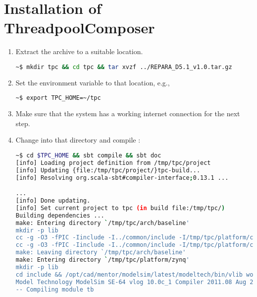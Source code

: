 \section{Installation of ThreadpoolComposer}%
\begin{enumerate}
  \item Extract the \tpc{} archive to a suitable location.
%
\begin{lstlisting}[language=bash]
~$ mkdir tpc && cd tpc && tar xvzf ../REPARA_D5.1_v1.0.tar.gz
\end{lstlisting}
%
  \item Set the  environment variable to that location, e.g.,
%
\begin{lstlisting}[language=bash]
~$ export TPC_HOME=~/tpc
\end{lstlisting}
%
  \item Make sure that the system has a working internet connection for the next step.
  \item Change into that directory and compile \tpc{}:
        \begin{lstlisting}[language=bash]
~$ cd $TPC_HOME && sbt compile && sbt doc
[info] Loading project definition from /tmp/tpc/project
[info] Updating {file:/tmp/tpc/project/}tpc-build...
[info] Resolving org.scala-sbt#compiler-interface;0.13.1 ...

...
[info] Done updating.
[info] Set current project to tpc (in build file:/tmp/tpc/)
Building dependencies ...
make: Entering directory `/tmp/tpc/arch/baseline'
mkdir -p lib
cc -g -O3 -fPIC -Iinclude -I../common/include -I/tmp/tpc/platform/common/include -I../common/src -std=gnu99 -pedantic-errors -Wall -Werror  -shared -o lib/libtpc-baseline-sim.so src/tpc_sim.c src/tpc_device.c src/tpc_address_map.c ../common/src/tpc_errors.c ../common/src/tpc_functions.c ../common/src/tpc_scheduler.c ../common/src/tpc_jobs.c
cc -g -O3 -fPIC -Iinclude -I../common/include -I/tmp/tpc/platform/common/include -I../common/src -std=gnu99 -pedantic-errors -Wall -Werror  -shared -o lib/libtpc-baseline-bit.so src/tpc_sim.c src/tpc_device.c src/tpc_address_map.c ../common/src/tpc_errors.c ../common/src/tpc_functions.c ../common/src/tpc_scheduler.c ../common/src/tpc_jobs.c
make: Leaving directory `/tmp/tpc/arch/baseline'
make: Entering directory `/tmp/tpc/platform/zynq'
mkdir -p lib
cd include && /opt/cad/mentor/modelsim/latest/modeltech/bin/vlib work  && /opt/cad/mentor/modelsim/latest/modeltech/bin/vlog -dpiheader platform_dpi.h -sv ../sv/platform-dpi.sv +incdir+../include && rm -rf work transcript
Model Technology ModelSim SE-64 vlog 10.0c_1 Compiler 2011.08 Aug 26 2011
-- Compiling module tb


\end{lstlisting}
\end{enumerate}
